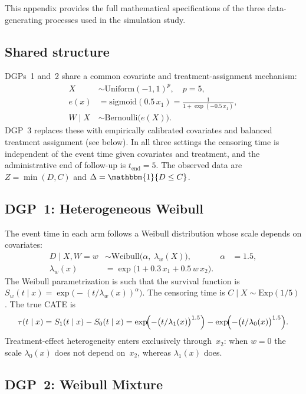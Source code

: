 \documentclass{article}
\DeclareMathOperator{\IDF}{\mathbbm{1}}%
\newcommand{\tend}{t_{\mathrm{end}}}
\begin{document}
This appendix provides the full mathematical specifications of the three data-generating processes used in the simulation study.

\subsection*{Shared structure}
DGPs~1 and~2 share a common covariate and treatment-assignment mechanism:
\begin{align*}
  X &\sim \mathrm{Uniform}(-1,1)^p, \quad p=5, \\
  e(x) &= \mathrm{sigmoid}(0.5\, x_1)
         = \frac{1}{1+\exp(-0.5\, x_1)}, \\
  W \mid X &\sim \mathrm{Bernoulli}\bigl(e(X)\bigr).
\end{align*}
DGP~3 replaces these with empirically calibrated covariates and balanced treatment assignment (see below).
In all three settings the censoring time is independent of the event time given covariates and treatment, and the administrative end of follow-up is $\tend=5$.  The observed data are $Z = \min(D, C)$ and $\Delta = \IDF\{D \le C\}$.

\subsection*{DGP~1: Heterogeneous Weibull}

The event time in each arm follows a Weibull distribution whose scale depends on covariates:
\begin{align*}
  D \mid X, W=w
    &\sim \mathrm{Weibull}\!\bigl(\alpha,\; \lambda_w(X)\bigr),
    &
  \alpha &= 1.5,
  \\
  \lambda_w(x)
    &= \exp\!\bigl(1 + 0.3\, x_1 + 0.5\, w\, x_2\bigr).
\end{align*}
The Weibull parametrization is such that the survival function is
$S_w(t \mid x) = \exp\!\bigl(-(t / \lambda_w(x))^{\alpha}\bigr)$.
The censoring time is $C \mid X \sim \mathrm{Exp}(1/5)$.
The true CATE is
\[
  \tau(t \mid x) = S_1(t \mid x) - S_0(t \mid x)
  = \exp\!\Bigl(-\bigl(t / \lambda_1(x)\bigr)^{1.5}\Bigr)
  - \exp\!\Bigl(-\bigl(t / \lambda_0(x)\bigr)^{1.5}\Bigr).
\]
Treatment-effect heterogeneity enters exclusively through~$x_2$: when $w=0$ the scale $\lambda_0(x)$ does not depend on~$x_2$, whereas $\lambda_1(x)$ does.

\subsection*{DGP~2: Weibull Mixture}
\end{document}
